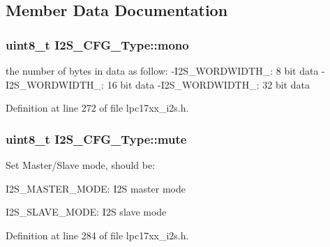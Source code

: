 \subsection{\-Member \-Data \-Documentation}
\hypertarget{struct_i2_s___c_f_g___type_add3897caf9b0990069238f838c113640}{
\subsubsection[{mono}]{\setlength{\rightskip}{0pt plus 5cm}uint8\-\_\-t {\bf \-I2\-S\-\_\-\-C\-F\-G\-\_\-\-Type\-::mono}}}\label{struct_i2_s___c_f_g___type_add3897caf9b0990069238f838c113640}
the number of bytes in data as follow\-: -\/\-I2\-S\-\_\-\-W\-O\-R\-D\-W\-I\-D\-T\-H\-\_\-: 8 bit data -\/\-I2\-S\-\_\-\-W\-O\-R\-D\-W\-I\-D\-T\-H\-\_\-: 16 bit data -\/\-I2\-S\-\_\-\-W\-O\-R\-D\-W\-I\-D\-T\-H\-\_\-: 32 bit data 

\-Definition at line 272 of file lpc17xx\-\_\-i2s.\-h.

\hypertarget{struct_i2_s___c_f_g___type_af5e18d652400b3508c8d450e7481700b}{
\subsubsection[{mute}]{\setlength{\rightskip}{0pt plus 5cm}uint8\-\_\-t {\bf \-I2\-S\-\_\-\-C\-F\-G\-\_\-\-Type\-::mute}}}\label{struct_i2_s___c_f_g___type_af5e18d652400b3508c8d450e7481700b}
\-Set \-Master/\-Slave mode, should be\-:
\begin{DoxyItemize}
\item \-I2\-S\-\_\-\-M\-A\-S\-T\-E\-R\-\_\-\-M\-O\-D\-E\-: \-I2\-S master mode
\item \-I2\-S\-\_\-\-S\-L\-A\-V\-E\-\_\-\-M\-O\-D\-E\-: \-I2\-S slave mode 
\end{DoxyItemize}

\-Definition at line 284 of file lpc17xx\-\_\-i2s.\-h.

